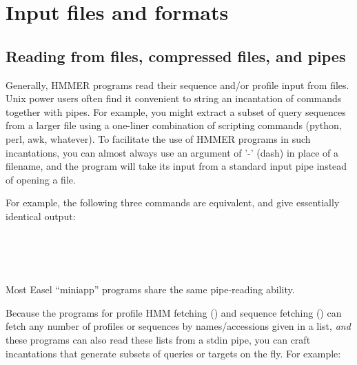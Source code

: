 \chapter{Input files and formats}
\label{chapter:formats}
\setcounter{footnote}{0}

\section{Reading from files, compressed files, and pipes}

Generally, HMMER programs read their sequence and/or profile input
from files. Unix power users often find it convenient to string an
incantation of commands together with pipes. For example, you might
extract a subset of query sequences from a larger file using a
one-liner combination of scripting commands (python, perl, awk,
whatever). To facilitate the use of HMMER programs in such
incantations, you can almost always use an argument of '-' (dash) in
place of a filename, and the program will take its input from a
standard input pipe instead of opening a file.

For example, the following three commands are equivalent, and give
essentially identical output:

   \vspace{1ex}
     \\
    \\
    \\
   \vspace{1ex}

Most Easel ``miniapp'' programs share the same pipe-reading ability.

Because the programs for profile HMM fetching () and
sequence fetching () can fetch any number of profiles
or sequences by names/accessions given in a list, \emph{and} these
programs can also read these lists from a stdin pipe, you can craft
incantations that generate subsets of queries or targets on the
fly. For example:

   \vspace{1ex}
   \begin{fullwidth}
    \\
    \\
   \end{fullwidth}
   \vspace{1ex}

